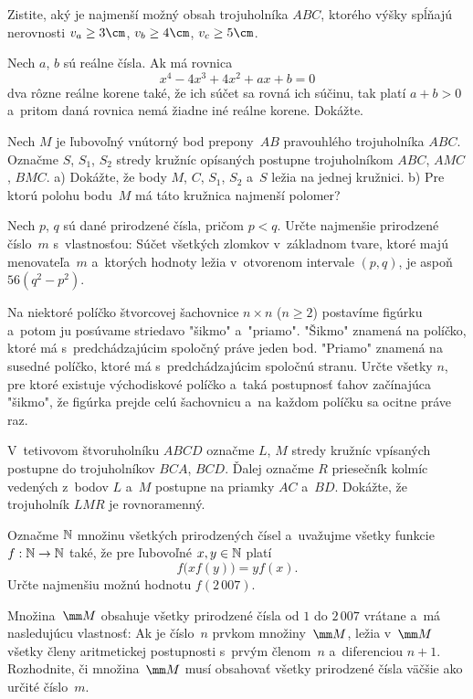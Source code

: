 {%
Zistite, aký je najmenší možný obsah trojuholníka $ABC$, ktorého
výšky spĺňajú nerovnosti $v_a\ge3\cm$, $v_b\ge4\cm$,
$v_c\ge5\cm$.}

{%
Nech $a$, $b$ sú reálne čísla. Ak má rovnica
$$
x^4-4x^3+4x^2+ax+b=0
$$
dva rôzne reálne korene také, že ich súčet sa rovná ich
súčinu, tak platí $a+b>0$ a~pritom daná rovnica nemá žiadne iné
reálne korene. Dokážte.}

{%
Nech $M$ je ľubovoľný vnútorný bod prepony~$AB$ pravouhlého
trojuholníka $ABC$. Označme $S$, $S_1$, $S_2$ stredy kružníc
opísaných postupne trojuholníkom $ABC$, $AMC$, $BMC$.
\ite a) Dokážte, že body $M$, $C$, $S_1$, $S_2$ a~$S$ ležia na jednej kružnici.
\ite b) Pre ktorú polohu bodu~$M$ má táto kružnica najmenší polomer?}

{%
Nech $p$, $q$ sú dané prirodzené čísla, pričom $p<q$. Určte najmenšie
prirodzené číslo~$m$ s~vlastnosťou: Súčet všetkých zlomkov v~základnom
tvare, ktoré majú menovateľa~$m$ a~ktorých hodnoty ležia
v~otvorenom intervale $(p,q)$, je aspoň $56(q^2-p^2)$.}

{%
Na niektoré políčko štvorcovej šachovnice $n\times n$ ($n\geq 2$)
postavíme figúrku a~potom ju posúvame striedavo "šikmo" a~"priamo".
"Šikmo" znamená na políčko, ktoré má s~predchádzajúcim spoločný práve
jeden bod. "Priamo" znamená na susedné políčko, ktoré má
s~predchádzajúcim spoločnú stranu. Určte všetky $n$, pre ktoré
existuje východiskové políčko a~taká postupnosť ťahov začínajúca "šikmo",
že figúrka prejde celú šachovnicu a~na každom políčku sa ocitne
práve raz.}

{%
V~tetivovom štvoruholníku $ABCD$ označme $L$, $M$ stredy kružníc
vpísaných postupne do trojuholníkov $BCA$, $BCD$. Ďalej označme $R$
priesečník kolmíc vedených z~bodov $L$ a~$M$ postupne na priamky $AC$
a~$BD$. Dokážte, že trojuholník $LMR$ je rovnoramenný.}

{%
Označme $\Bbb N$ množinu všetkých prirodzených čísel a~uvažujme všetky
funkcie $f:\Bbb N\to \Bbb N$ také, že pre ľubovoľné $x,y\in \Bbb N$ platí
$$
f\bigl(xf(y)\bigr)=yf(x).
$$
Určte najmenšiu možnú hodnotu $f(2\,007)$.}

{%
Množina~$\mm M$ obsahuje všetky prirodzené čísla od $1$ do $2\,007$
vrátane a~má nasledujúcu vlastnosť: Ak je číslo~$n$ prvkom množiny~$\mm M$,
ležia v~$\mm M$ všetky členy aritmetickej postupnosti s~prvým
členom~$n$ a~diferenciou $n+1$. Rozhodnite, či množina~$\mm M$ musí
obsahovať všetky prirodzené čísla väčšie ako určité číslo~$m$.}

